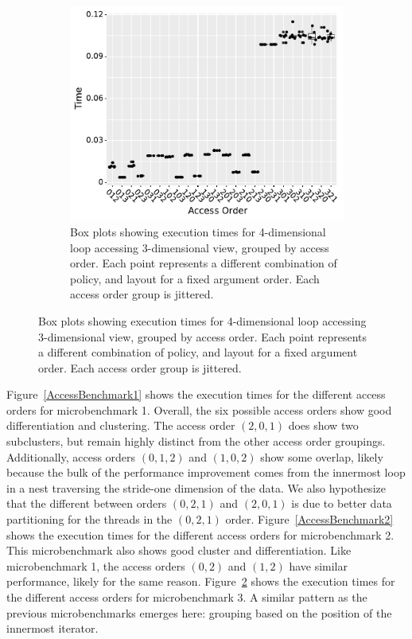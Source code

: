 \documentclass[sigconf,review=true]{acmart}
\begin{document}
\begin{figure}
\bigskip
\begin{subfigure}{.48\textwidth}
	\includegraphics[width=\textwidth]{benchmark3_boxplot.pdf}
	\caption{Box plots showing execution times for 4-dimensional loop accessing 3-dimensional view, grouped by access order. Each point represents a different combination of policy, and layout for a fixed argument order. Each access order group is jittered.}
	\label{AccessBenchmark3}
\end{subfigure}
\end{figure}

Figure~\ref{AccessBenchmark1} shows the execution times for the different access orders for microbenchmark 1.
Overall, the six possible access orders show good differentiation and clustering.
The access order $(2,0,1)$ does show two subclusters, but remain highly distinct from the other access order groupings. 
Additionally, access orders $(0,1,2)$ and $(1,0,2)$ show some overlap, likely because the bulk of the performance improvement comes from the innermost loop in a nest traversing the stride-one dimension of the data.
We also hypothesize that the different between orders $(0,2,1)$ and $(2,0,1)$ is due to better data partitioning for the threads in the $(0,2,1)$ order. 
Figure~\ref{AccessBenchmark2} shows the execution times for the different access orders for microbenchmark 2. 
This microbenchmark also shows good cluster and differentiation.
Like microbenchmark 1, the access orders $(0,2)$ and $(1,2)$ have similar performance, likely for the same reason. 
Figure~\ref{AccessBenchmark3} shows the execution times for the different access orders for microbenchmark 3.
A similar pattern as the previous microbenchmarks emerges here: grouping based on the position of the innermost iterator. 
\end{document}
